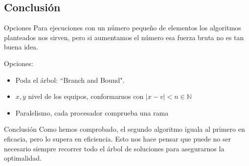 \subsection{Conclusión}
\begin{frame}
	\begin{block}{Opciones}
	Para ejecuciones con un número pequeño de elementos los algoritmos planteados nos sirven, 
	pero si aumentamos el número esa fuerza bruta no es tan buena idea.
	
	Opciones:
	\begin{itemize}
		\item Poda el árbol: ``Branch and Bound".
		\item $x,y$ nivel de los equipos, conformarnos con $|x-v|<n\in\mathbb{N}$
		\item Paralelismo, cada procesador comprueba una rama
	\end{itemize}
	\end{block}
	
	\pause
	\begin{alertblock}{Conclusión}
	Como hemos comprobado, el segundo algoritmo iguala al primero en eficacia, pero lo supera
	en eficiencia.
	Esto nos hace pensar que puede no ser necesario siempre recorrer todo el árbol de soluciones 
	para asegurarnos la optimalidad.
	\end{alertblock}
\end{frame}